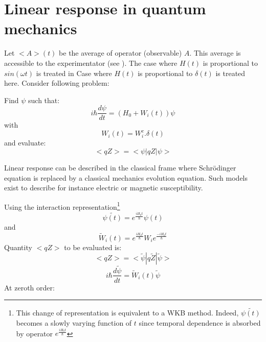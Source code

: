 \documentclass[12pt]{book}
\begin{document}
\section{Linear response in quantum mechanics}\label{secreplinmq}
Let $ \mathrel{<} A\mathrel{>} (t)$ be the average of operator (observable) $A$. This
average is accessible to the experimentator (see
\cite{ph:mecaq:Cohen73}).
The case where $H(t)$ is proportional to $sin(\omega t)$ is treated in
\cite{ph:mecaq:Cohen73} 
Case where $H(t)$ is proportional to  $\delta(t)$ is treated here.  
Consider following problem:
\begin{prob}
Find $\psi$ such that:
\begin{equation}
i\hbar \frac{d\psi}{dt}=(H_0+W_i(t))\psi
\end{equation}
with
\begin{equation}
W_i(t)=W_i^c.\delta(t)
\end{equation}
and evaluate: 
\begin{equation}
 \mathrel{<} qZ\mathrel{>} = \mathrel{<} \psi|qZ|\psi\mathrel{>} 
\end{equation}
\end{prob}
\begin{rem}
Linear response can be described in the classical frame where Schr\"odinger
equation is replaced by a classical mechanics evolution equation. Such models
exist to describe for instance electric or magnetic susceptibility.
\end{rem}
Using the interaction representation\footnote{%
This change of representation is equivalent to a WKB method. Indeed,
$\tilde{\psi(t)}$ becomes a slowly varying function of $t$ since temporal
dependence is absorbed by operator $e^{\frac{iH_0t}{\hbar}}$}%
\begin{equation}
\tilde{\psi(t)}=e^{\frac{iH_0t}{\hbar}}\psi(t)
\end{equation}
and
\begin{equation}
\tilde{W}_i(t)=e^{\frac{iH_0t}{\hbar}}W_ie^{\frac{-iH_0t}{\hbar}}
\end{equation}
Quantity $ \mathrel{<} qZ\mathrel{>} $ to be evaluated is:
\begin{equation}
 \mathrel{<} qZ\mathrel{>} = \mathrel{<} \tilde{\psi}|q\tilde{Z}|\tilde{\psi}\mathrel{>} 
\end{equation}
\begin{equation}
i\hbar \frac{d\tilde{\psi}}{dt}=\tilde{W}_i(t)\tilde{\psi}
\end{equation}
At zeroth order:
\end{document}
